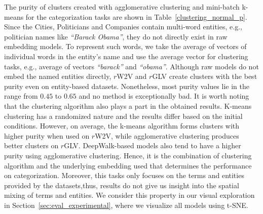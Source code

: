 The purity of clusters created with agglomerative clustering and mini-batch k-means for the categorization tasks are shown in Table~\ref{clustering_normal_p}. Since the Cities, Politicians and Companies contain multi-word entities, e.g., politician names like \emph{``Barack Obama''}, they do not directly exist in raw embedding models. To represent such words, we take the average of vectors of individual words in the entity's name and use the average vector for clustering tasks, e.g., average of vectors \emph{``barack''} and \emph{``obama''}. Although raw models do not embed the named entities directly, $r$W2V and $r$GLV create clusters with the best purity even on entity-based datasets. Nonetheless, most purity values lie in the range from $0.45$ to $0.65$ and no method is exceptionally bad. It is worth noting that the clustering algorithm also plays a part in the obtained results. K-means clustering has a randomized nature and the results differ based on the initial conditions. However, on average, the k-means algorithm forms clusters with higher purity when used on $r$W2V, while agglomerative clustering produces better clusters on $r$GLV. DeepWalk-based models also tend to have a higher purity using agglomerative clustering. Hence, it is the combination of clustering algorithm and the underlying embedding used that determines the performance on categorization. Moreover, this tasks only focuses on the terms and entities provided by the datasets,thus, results do not give us insight into the spatial mixing of terms and entities. We consider this property in our visual exploration in Section~\ref{sec:eval_experimental}, where we visualize all models using t-SNE.\\
